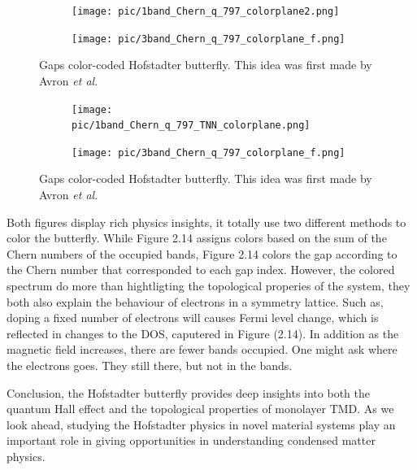 \documentclass{report}
\begin{document}
\begin{figure}[htb]
	\centering
	\begin{subfigure}[b]{0.495\textwidth}
		\centering
		{\texttt{[image: pic/1band\_Chern\_q\_797\_colorplane2.png]}}
	\end{subfigure}
	\begin{subfigure}[b]{0.495\textwidth}
		\centering
		\texttt{[image: pic/3band\_Chern\_q\_797\_colorplane\_f.png]}
	\end{subfigure}
	\caption{
		Gaps color-coded Hofstadter butterfly. This idea was first made by Avron \textit{et al}\cite{avron2003}.
	}
\end{figure}
\begin{figure}[htb]
	\centering
	\begin{subfigure}[b]{0.495\textwidth}
		\centering
		{\texttt{[image: pic/1band\_Chern\_q\_797\_TNN\_colorplane.png]}}
	\end{subfigure}
	\begin{subfigure}[b]{0.495\textwidth}
		\centering
		\texttt{[image: pic/3band\_Chern\_q\_797\_colorplane\_f.png]}
	\end{subfigure}
	\caption{
		Gaps color-coded Hofstadter butterfly. This idea was first made by Avron \textit{et al}\cite{avron2003}.
	}
\end{figure}

Both figures display rich physics insights, it totally use two different methods to color the butterfly. While Figure 2.14 assigns colors based on the sum of the Chern numbers of the occupied bands, Figure 2.14 colors the gap according to the Chern number that corresponded to each gap index. However, the colored spectrum do more than hightligting the topological properies of the system, they both also explain the behaviour of electrons in a symmetry lattice. Such as, doping a fixed number of electrons will causes Fermi level change, which is reflected in changes to the \ac{DOS}, caputered in Figure (2.14). In addition as the magnetic field increases, there are fewer bands occupied. One might ask where the electrons goes. They still there, but not in the bands.


Conclusion, the Hofstadter butterfly provides deep insights into both the quantum Hall effect and the topological properties of monolayer \ac{TMD}. As we look ahead, studying the Hofstadter physics in novel material systems play an important role in giving opportunities in understanding condensed matter physics.
\end{document}
